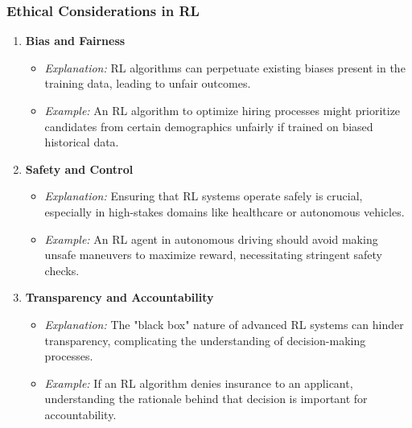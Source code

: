 \documentclass{beamer}
\begin{document}
\begin{frame}[fragile]
    \frametitle{Ethical Considerations in RL}
    \begin{enumerate}
        \item \textbf{Bias and Fairness}
        \begin{itemize}
            \item \textit{Explanation:} RL algorithms can perpetuate existing biases present in the training data, leading to unfair outcomes.
            \item \textit{Example:} An RL algorithm to optimize hiring processes might prioritize candidates from certain demographics unfairly if trained on biased historical data.
        \end{itemize}
        
        \item \textbf{Safety and Control}
        \begin{itemize}
            \item \textit{Explanation:} Ensuring that RL systems operate safely is crucial, especially in high-stakes domains like healthcare or autonomous vehicles.
            \item \textit{Example:} An RL agent in autonomous driving should avoid making unsafe maneuvers to maximize reward, necessitating stringent safety checks.
        \end{itemize}
        
        \item \textbf{Transparency and Accountability}
        \begin{itemize}
            \item \textit{Explanation:} The "black box" nature of advanced RL systems can hinder transparency, complicating the understanding of decision-making processes.
            \item \textit{Example:} If an RL algorithm denies insurance to an applicant, understanding the rationale behind that decision is important for accountability.
        \end{itemize}
    \end{enumerate}
\end{frame}
\end{document}
